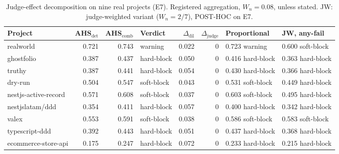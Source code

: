 \documentclass[10pt,a4paper]{article}
\begin{document}
\begin{table}[t]
\centering
\caption{Judge-effect decomposition on nine real projects (E7). Registered aggregation, $W_n = 0.08$, unless
stated. JW: judge-weighted variant ($W_n = 2/7$), POST-HOC on E7.}
\label{tab:e7}
\small
\begin{tabular}{@{}lrrlrrll@{}}
\toprule
Project & AHS$_\mathrm{det}$ & AHS$_\mathrm{comb}$ & Verdict & $\Delta_\mathrm{dil}$ & $\Delta_\mathrm{judge}$ & Proportional & JW, any-fail \\
\midrule
realworld & 0.721 & 0.743 & warning & 0.022 & 0 & 0.723 warning & 0.600 soft-block \\
ghostfolio & 0.387 & 0.437 & hard-block & 0.050 & 0 & 0.416 hard-block & 0.363 hard-block \\
truthy & 0.387 & 0.441 & hard-block & 0.054 & 0 & 0.430 hard-block & 0.366 hard-block \\
dry-run & 0.504 & 0.547 & soft-block & 0.043 & 0 & 0.531 soft-block & 0.449 hard-block \\
nestjs-active-record & 0.571 & 0.608 & soft-block & 0.037 & 0 & 0.603 soft-block & 0.495 hard-block \\
nestjslatam/ddd & 0.354 & 0.411 & hard-block & 0.057 & 0 & 0.400 hard-block & 0.342 hard-block \\
valex & 0.553 & 0.591 & soft-block & 0.038 & 0 & 0.586 soft-block & 0.583 soft-block \\
typescript-ddd & 0.392 & 0.443 & hard-block & 0.051 & 0 & 0.437 hard-block & 0.368 hard-block \\
ecommerce-store-api & 0.175 & 0.247 & hard-block & 0.072 & 0 & 0.233 hard-block & 0.215 hard-block \\
\bottomrule
\end{tabular}
\end{table}
\end{document}
